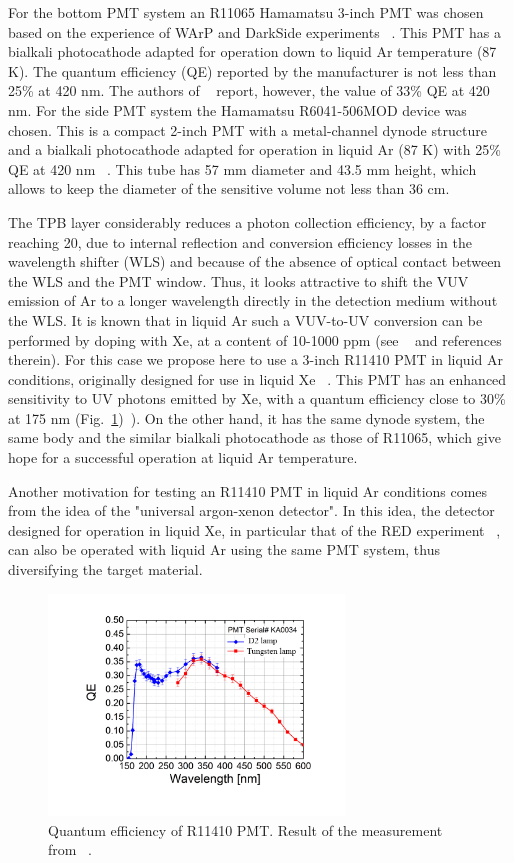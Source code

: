 \documentclass[a4paper,11pt]{article}
\begin{document}
For the bottom PMT system an R11065 Hamamatsu 3-inch PMT was chosen based on the experience of WArP and DarkSide experiments ~\cite{PMT-WARP, PMT-DarkSide}. 
This PMT has a bialkali photocathode adapted for operation down to liquid Ar temperature (87 K). The quantum efficiency (QE) 
reported by the manufacturer is not less than 25\% at 420 nm. The
authors of  ~\cite{PMT-WARP} report, however, the value of 33\% QE at 420 nm. For the side PMT system the Hamamatsu R6041-506MOD device was chosen. 
This is a compact 2-inch PMT with a metal-channel dynode structure and a bialkali photocathode adapted for
operation in liquid Ar (87 K) with 25\% QE at 420 nm ~\cite{R6041specs}. This tube has 57 mm diameter and 43.5 mm height, which allows to keep 
the diameter of the sensitive volume not less than 36 cm.

The TPB layer considerably reduces a photon collection efficiency, by a factor reaching 20, due to internal reflection 
and conversion efficiency losses in the wavelength shifter (WLS) and because of the absence of optical contact between the WLS 
and the PMT window. Thus, it looks attractive to shift the VUV emission of Ar to a longer wavelength directly in the detection medium without the WLS. 
It is known that in liquid Ar such a VUV-to-UV conversion can be performed by doping with Xe, 
at a content of 10-1000 ppm (see ~\cite{doping_paper} and references therein). 
For this case we propose here to use a 3-inch R11410 PMT in liquid Ar conditions, 
originally designed for use in liquid Xe ~\cite{Xe-PMT1,Xe-PMT2,Xe-PMT3,Xe-PMT4}. 
This PMT has an enhanced sensitivity to UV photons emitted by Xe, with a quantum efficiency close to 30\% at 175 nm
(Fig.~\ref{fig:QER11410})~\cite{Lyashenko}). 
On the other hand, it has the same dynode system, the same body and the similar bialkali photocathode as those of R11065, 
which give hope for a successful operation at liquid Ar temperature.   

Another motivation for testing an R11410 PMT in liquid Ar conditions comes from the idea of the "universal argon-xenon detector". 
In this idea, the detector designed for operation in liquid Xe, in particular that of the RED experiment ~\cite{Xe-PMT4}, 
can also be operated with liquid Ar using the same PMT system, thus diversifying the target material.  
\begin{figure}[htbp]
\centering
\includegraphics[width=0.7\textwidth,viewport=1 1 700 500,clip]{figures/QER11410.png}
\caption{Quantum efficiency of R11410 PMT. Result of the measurement from ~\cite{Lyashenko}.}
\label{fig:QER11410}
\end{figure}
\end{document}
